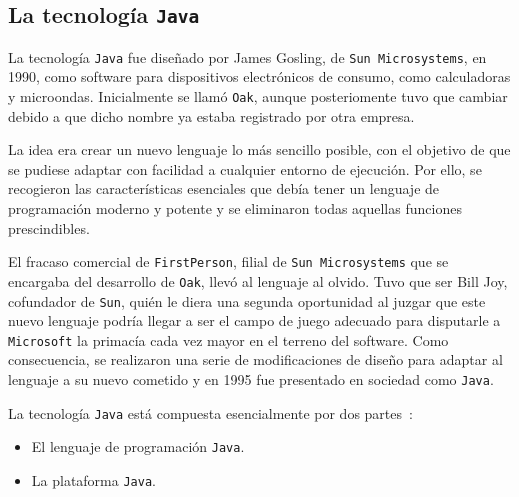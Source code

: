 
  \subsection{La tecnología \texttt{Java}}
La tecnología \texttt{Java} fue diseñado por James Gosling, de \texttt{Sun 
Microsystems}, en 1990, como software para dispositivos electrónicos de
consumo, como calculadoras y microondas. Inicialmente se llamó \texttt{Oak},
aunque posteriomente tuvo que cambiar debido a que dicho nombre ya estaba
registrado por otra empresa.

La idea era crear un nuevo lenguaje lo más sencillo posible, con el objetivo
de que se pudiese adaptar con facilidad a cualquier entorno de ejecución. Por
ello, se recogieron las características esenciales que debía tener un lenguaje
de programación moderno y potente y se eliminaron todas aquellas funciones
prescindibles.

El fracaso comercial de \texttt{FirstPerson}, filial de \texttt{Sun
Microsystems} que se encargaba del desarrollo de \texttt{Oak}, llevó al
lenguaje al olvido. Tuvo que ser Bill Joy, cofundador de \texttt{Sun}, quién
le diera una segunda oportunidad al juzgar que este nuevo lenguaje podría
llegar a ser el campo de juego adecuado para disputarle a \texttt{Microsoft}
la primacía cada vez mayor en el terreno del software. Como consecuencia, se
realizaron una serie de modificaciones de diseño para adaptar al lenguaje
a su nuevo cometido y en 1995 fue presentado en sociedad como \texttt{Java}.

La tecnología \texttt{Java} está compuesta esencialmente por dos
partes~\cite{bib:java}:
\begin{itemize}
\item El lenguaje de programación \texttt{Java}.
\item La plataforma \texttt{Java}.
\end{itemize}

